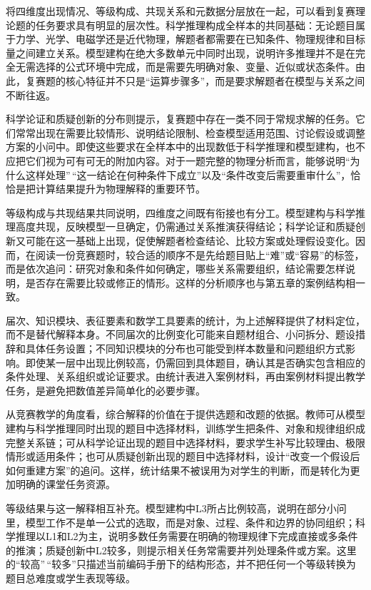 \documentclass[
  12pt,
  a4paper]{ctexbook}
\begin{document}
将四维度出现情况、等级构成、共现关系和元数据分层放在一起，可以看到复赛理论题的任务要求具有明显的层次性。科学推理构成全样本的共同基础：无论题目属于力学、光学、电磁学还是近代物理，解题者都需要在已知条件、物理规律和目标量之间建立关系。模型建构在绝大多数单元中同时出现，说明许多推理并不是在完全无需选择的公式环境中完成，而是需要先明确对象、变量、近似或状态条件。由此，复赛题的核心特征并不只是``运算步骤多''，而是要求解题者在模型与关系之间不断往返。

科学论证和质疑创新的分布则提示，复赛题中存在一类不同于常规求解的任务。它们常常出现在需要比较情形、说明结论限制、检查模型适用范围、讨论假设或调整方案的小问中。即使这些要求在全样本中的出现数低于科学推理和模型建构，也不应把它们视为可有可无的附加内容。对于一题完整的物理分析而言，能够说明``为什么这样处理''\,``这一结论在何种条件下成立''以及``条件改变后需要重审什么''，恰恰是把计算结果提升为物理解释的重要环节。

等级构成与共现结果共同说明，四维度之间既有衔接也有分工。模型建构与科学推理高度共现，反映模型一旦确定，仍需通过关系推演获得结论；科学论证和质疑创新又可能在这一基础上出现，促使解题者检查结论、比较方案或处理假设变化。因而，在阅读一份竞赛题时，较合适的顺序不是先给题目贴上``难''或``容易''的标签，而是依次追问：研究对象和条件如何确定，哪些关系需要组织，结论需要怎样说明，是否存在需要比较或修正的情形。这样的分析顺序也与第五章的案例结构相一致。

届次、知识模块、表征要素和数学工具要素的统计，为上述解释提供了材料定位，而不是替代解释本身。不同届次的比例变化可能来自题材组合、小问拆分、题设措辞和具体任务设置；不同知识模块的分布也可能受到样本数量和问题组织方式影响。即使某一层中出现比例较高，仍需回到具体题目，确认其是否确实包含相应的条件处理、关系组织或论证要求。由统计表进入案例材料，再由案例材料提出教学任务，是避免把数值差异简单化的必要步骤。

从竞赛教学的角度看，综合解释的价值在于提供选题和改题的依据。教师可从模型建构与科学推理同时出现的题目中选择材料，训练学生把条件、对象和规律组织成完整关系链；可从科学论证出现的题目中选择材料，要求学生补写比较理由、极限情形或适用条件；也可从质疑创新出现的题目中选择材料，设计``改变一个假设后如何重建方案''的追问。这样，统计结果不被误用为对学生的判断，而是转化为更加明确的课堂任务资源。

等级结果与这一解释相互补充。模型建构中L3所占比例较高，说明在部分小问里，模型工作不是单一公式的选取，而是对象、过程、条件和边界的协同组织；科学推理以L1和L2为主，说明多数任务需要在明确的物理规律下完成直接或多条件的推演；质疑创新中L2较多，则提示相关任务常需要并列处理条件或方案。这里的``较高''\,``较多''只描述当前编码手册下的结构形态，并不把任何一个等级转换为题目总难度或学生表现等级。
\end{document}
